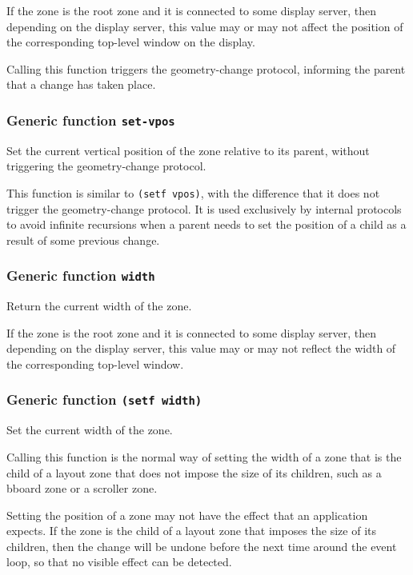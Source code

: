 \documentclass{report}
\begin{document}
If the zone is the root zone and it is connected to some display
server, then depending on the display server, this value may or
may not affect the position of the corresponding top-level window
on the display.

Calling this function triggers the geometry-change protocol,
informing the parent that a change has taken place.  

\subsubsection{Generic function \texttt{set-vpos}}

Set the current vertical position of the zone relative to its
parent, without triggering the geometry-change protocol.

This function is similar to \texttt{(setf vpos)}, with the difference
that it does not trigger the geometry-change protocol.  It is used
exclusively by internal protocols to avoid infinite recursions when a
parent needs to set the position of a child as a result of some
previous change.

\subsubsection{Generic function \texttt{width}}

Return the current width of the zone.  

If the zone is the root zone and it is connected to some display
server, then depending on the display server, this value may or
may not reflect the width of the corresponding top-level window.

\subsubsection{Generic function \texttt{(setf width)}}

Set the current width of the zone.

Calling this function is the normal way of setting the width of a
zone that is the child of a layout zone that does not impose the
size of its children, such as a bboard zone or a scroller zone.

Setting the position of a zone may not have the effect that an
application expects.  If the zone is the child of a layout zone
that imposes the size of its children, then the change will be
undone before the next time around the event loop, so that no
visible effect can be detected.
\end{document}
